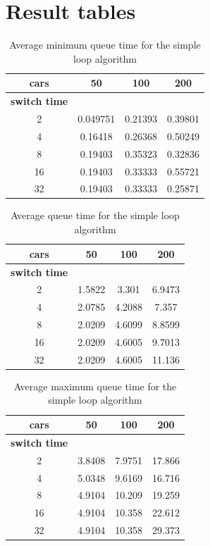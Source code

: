 \documentclass[a4paper,11pt]{article}
\begin{document}




\appendix
\section{Result tables}\label{app:rtables}

\begin{table}[htb]
\centering
\begin{tabular}{cccc}
\hline
\textbf{cars} & 50 & 100 & 200\\
\hline
\textbf{switch time} & & & \\
2 & 0.049751 & 0.21393 & 0.39801 \\
4 & 0.16418 & 0.26368 & 0.50249 \\
8 & 0.19403 & 0.35323 & 0.32836 \\
16 & 0.19403 & 0.33333 & 0.55721 \\
32 & 0.19403 & 0.33333 & 0.25871 \\
\hline
\end{tabular}
\label{tab:simpleloopmintime}
\caption{Average minimum queue time for the simple loop algorithm}
\end{table}

\begin{table}[htb]
\centering
\begin{tabular}{cccc}
\hline
\textbf{cars} & 50 & 100 & 200\\
\hline
\textbf{switch time} & & & \\
2 & 1.5822 & 3.301 & 6.9473 \\
4 & 2.0785 & 4.2088 & 7.357 \\
8 & 2.0209 & 4.6099 & 8.8599 \\
16 & 2.0209 & 4.6005 & 9.7013 \\
32 & 2.0209 & 4.6005 & 11.136 \\
\hline
\end{tabular}
\label{tab:simpleloopavgtime}
\caption{Average queue time for the simple loop algorithm}
\end{table}

\begin{table}[htb]
\centering
\begin{tabular}{cccc}
\hline
\textbf{cars} & 50 & 100 & 200\\
\hline
\textbf{switch time} & & & \\
2 & 3.8408 & 7.9751 & 17.866 \\
4 & 5.0348 & 9.6169 & 16.716 \\
8 & 4.9104 & 10.209 & 19.259 \\
16 & 4.9104 & 10.358 & 22.612 \\
32 & 4.9104 & 10.358 & 29.373 \\
\hline
\end{tabular}
\label{tab:simpleloopmaxtime}
\caption{Average maximum queue time for the simple loop algorithm}
\end{table}
\end{document}
